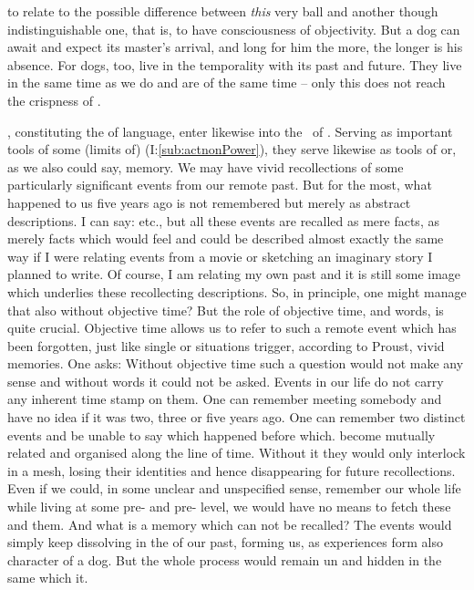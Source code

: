 to relate to the possible difference between {\em this} very ball and another
though indistinguishable one, that is, to have consciousness of objectivity. But
a dog can await and expect its master's arrival, and long for him the more, the
longer is his absence. For dogs, too, live in the temporality with its past and
future. They live in the same time as we do and are  of the same time
-- only this  does not reach the crispness of .

, constituting the  of language,
enter likewise into the \nexus\ of . Serving as important tools
of  some (limits of)  (I:\ref{sub:actnonPower}),
they serve likewise as tools of  or, as we also could say,
 memory. We may have vivid  recollections of some
particularly significant events from our remote past. But for the most, what
happened to us five years ago is not remembered  but merely as
abstract descriptions. I can say:  etc., but all these events are recalled as mere
facts, as merely  facts which would feel and could be described
almost exactly the same way if I were relating events from a movie or sketching
an imaginary story I planned to write. Of course, I am relating my own past and
it is still some  image which underlies these recollecting
descriptions. So, in principle, one might manage that also without objective
time? But the role of objective time, and words, is quite crucial. Objective
time allows us to refer to such a remote event which has been forgotten, just
like single  or situations trigger, according to Proust, vivid
 memories. One asks:   Without objective time such a question would not make any sense
and without words it could not be asked. Events in our life do not carry any
inherent time stamp on them. One can remember meeting somebody and have no idea
if it was two, three or five years ago. One can remember two distinct events and
be unable to say which happened before which.  become mutually
related and organised along the line of  time. Without it they
would only interlock in a  mesh, losing their identities and hence
disappearing for future recollections. Even if we could, in some unclear and
unspecified sense, remember our whole life while living at some
pre- and pre- level, we would have no means to
fetch these  and  them. And what is a memory which
can not be recalled? The events would simply keep dissolving in the
 of our past, forming us, as experiences form also character of a
dog. But the whole process would remain un and hidden in the same
 which  it.

